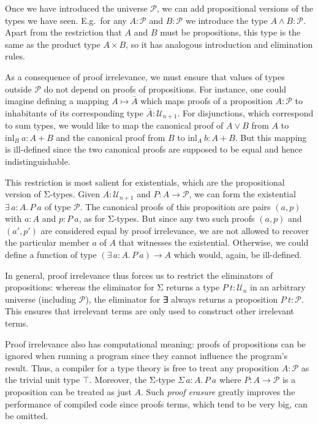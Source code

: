 \documentclass{scrartcl}
\theoremstyle{definition}
\newcommand{\Ex}[2]{∃\,#1.\, #2}
\newcommand{\SigT}[2]{Σ\,#1.\, #2}
\newcommand{\Univ}{\mathcal{U}}
\newcommand{\Prop}{\mathcal{P}}
\newcommand{\inl}{\ensuremath{\mathrm{inl}}}
\begin{document}
Once we have introduced the universe $\Prop$, we can add propositional versions of the types we have seen.
E.g.\ for any $A : \Prop$ and $B : \Prop$ we introduce the type $A ∧ B : \Prop$.
Apart from the restriction that $A$ and $B$ must be propositions, this type is the same as the product type $A × B$, so it has analogous introduction and elimination rules.

As a consequence of proof irrelevance, we must ensure that values of types outside $\Prop$ do not depend on proofs of propositions.
For instance, one could imagine defining a mapping $A ↦ \bar{A}$ which maps proofs of a proposition $A : \Prop$ to inhabitants of its corresponding type $\bar{A} : \Univ_{n+1}$.
For disjunctions, which correspond to sum types, we would like to map the canonical proof of $A ∨ B$ from $A$ to $\inl_{B}~a : A + B$ and the canonical proof from $B$ to $\inl_{A}~b : A + B$.
But this mapping is ill-defined since the two canonical proofs are supposed to be equal and hence indistinguishable.

This restriction is most salient for existentials, which are the propositional version of Σ-types.
Given $A : \Univ_{n+1}$ and $P : A → \Prop$, we can form the existential $\Ex{a : A}{P~a}$ of type $\Prop$.
The canonical proofs of this proposition are pairs $(a, p)$ with $a : A$ and $p : P~a$, as for Σ-types.
But since any two such proofs $(a, p)$ and $(a', p')$ are considered equal by proof irrelevance, we are not allowed to recover the particular member $a$ of $A$ that witnesses the existential.
Otherwise, we could define a function of type $(\Ex{a : A}{P~a}) → A$ which would, again, be ill-defined.

In general, proof irrelevance thus forces us to restrict the eliminators of propositions: whereas the eliminator for Σ returns a type $P~t : \Univ_{n}$ in an arbitrary universe (including $\Prop$), the eliminator for ∃ always returns a proposition $P~t : \Prop$.
This ensures that irrelevant terms are only used to construct other irrelevant terms.

Proof irrelevance also has computational meaning: proofs of propositions can be ignored when running a program since they cannot influence the program's result.
Thus, a compiler for a type theory is free to treat any proposition $A : \Prop$ as the trivial unit type $\top$.
Moreover, the Σ-type $\SigT{a : A}{P~a}$ where $P : A → \Prop$ is a proposition can be treated as just $A$.
Such \emph{proof erasure} greatly improves the performance of compiled code since proofs terms, which tend to be very big, can be omitted.


\end{document}
